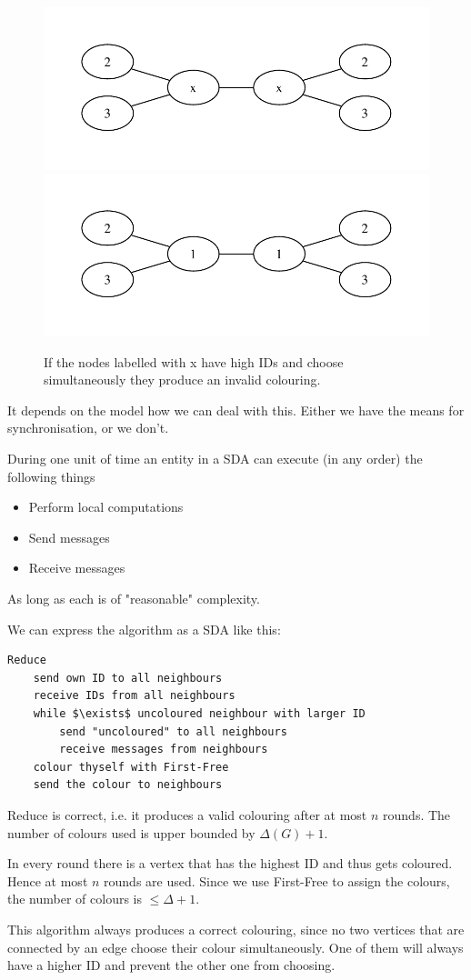 \begin{figure}
\includegraphics[width=0.5\linewidth]{./images/graph1}
\includegraphics[width=0.5\linewidth]{./images/graph11}
\caption{If the nodes labelled with x have high IDs and choose simultaneously they produce an invalid colouring.}
%
\label{fig:first-free-error}
\end{figure}

It depends on the model how we can deal with this. Either we have the means for synchronisation, or we don't.

\begin{Def} During one unit of time an entity in a SDA can execute (in any order) the following things
\begin{itemize}
\item Perform local computations
\item Send messages
\item Receive messages
\end{itemize}

As long as each is of "reasonable" complexity.
\end{Def}

We can express the algorithm as a SDA like this:

\begin{lstlisting}
Reduce
	send own ID to all neighbours
	receive IDs from all neighbours
	while $\exists$ uncoloured neighbour with larger ID
		send "uncoloured" to all neighbours
		receive messages from neighbours
	colour thyself with First-Free
	send the colour to neighbours
\end{lstlisting}

\begin{thm} Reduce is correct, i.e. it produces a valid colouring after at most $n$ rounds. The number of colours used is upper bounded by $\Delta(G)+1$. 
\end{thm}

\begin{pr} In every round there is a vertex that has the highest ID and thus gets coloured. Hence at most $n$ rounds are used. Since we use First-Free to assign the colours, the number of colours is $\leq \Delta+1$.

This algorithm always produces a correct colouring, since no two vertices that are connected by an edge choose their colour simultaneously. One of them will always have a higher ID and prevent the other one from choosing.
\end{pr}
